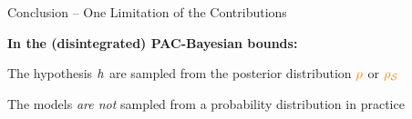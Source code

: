 \documentclass{slides}
\begin{document}
\begin{xframe}{Conclusion -- {\small One Limitation of the Contributions}}

\vspace{1.0cm}

\begin{xblock}{}

{\bf In the (disintegrated) PAC-Bayesian bounds:}\\[0.5cm]
\begin{xitemize}{}
\item[\red{\bf --}] The hypothesis $\textcolor{black}{h}$ are sampled from the posterior distribution $\textcolor{orange}{\rho}$ or $\textcolor{orange}{\rho}_{\textcolor{orange}{\mathcal{S}}}$\\[0.3cm]

\end{xitemize}
\end{xblock}

\vspace{0.5cm}

\begin{redbox}{}
 The models {\it are not} sampled from a probability distribution in practice
\end{redbox}
\end{xframe}

\end{document}
